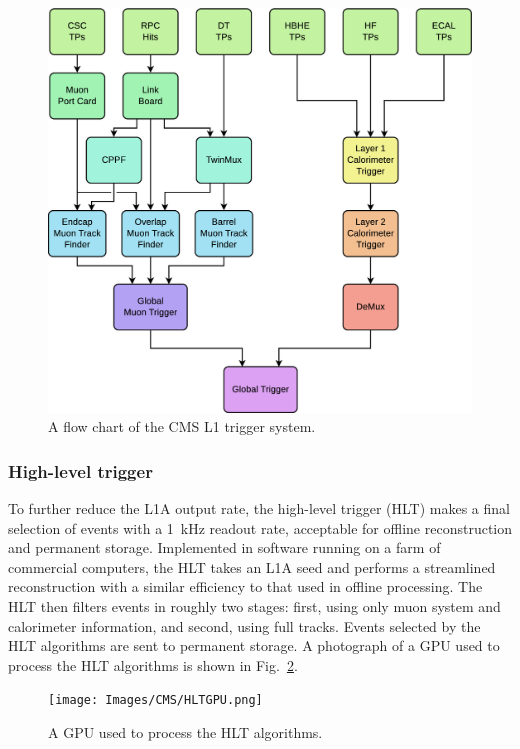 \begin{figure}[H]
    \centering
    \includegraphics[width=\textwidth]{Images/CMS/L1TriggerMap.png}
    \caption{A flow chart of the CMS L1 trigger system.}
    \label{fig:L1TriggerMap}
\end{figure}

\subsubsection{High-level trigger} \label{sec:HLT}
To further reduce the L1A output rate, the high-level trigger (HLT) makes a final selection of events with a \SI{1}{kHz} readout rate, acceptable for offline reconstruction and permanent storage. Implemented in software running on a farm of commercial computers, the HLT takes an L1A seed and performs a streamlined reconstruction with a similar efficiency to that used in offline processing. The HLT then filters events in roughly two stages: first, using only muon system and calorimeter information, and second, using full tracks. Events selected by the HLT algorithms are sent to permanent storage. A photograph of a GPU used to process the HLT algorithms is shown in Fig.~\ref{fig:HLTGPU}.

\begin{figure}[H]
    \centering
    \texttt{[image: Images/CMS/HLTGPU.png]}
    \caption{A GPU used to process the HLT algorithms.}
    \label{fig:HLTGPU}
\end{figure}